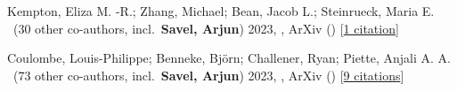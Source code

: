 \item[{\color{numcolor}\scriptsize2}] Kempton, Eliza M. -R.; Zhang, Michael; Bean, Jacob L.; Steinrueck, Maria E. \etal\ ({30} other co-authors, incl.\ \textbf{Savel, Arjun}) 2023, , ArXiv () [\href{https://ui.adsabs.harvard.edu/abs/2023arXiv230506240K}{1 citation}]

\item[{\color{numcolor}\scriptsize1}] Coulombe, Louis-Philippe; Benneke, Bj{\"o}rn; Challener, Ryan; Piette, Anjali A. A. \etal\ ({73} other co-authors, incl.\ \textbf{Savel, Arjun}) 2023, , ArXiv () [\href{https://ui.adsabs.harvard.edu/abs/2023arXiv230108192C}{9 citations}]